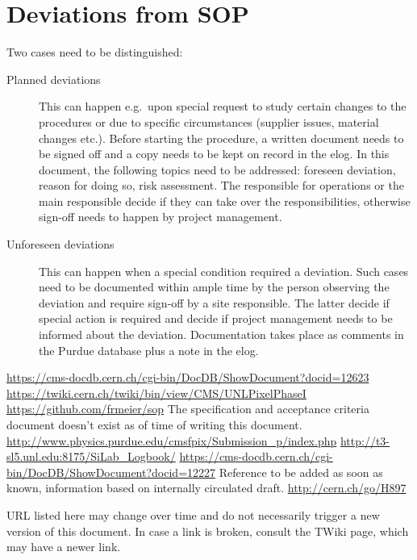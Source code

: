 \documentclass[12pt]{unlsilabsop}
\begin{document}
\section{Deviations from SOP}
Two cases need to be distinguished:
\begin{description}
    \item[Planned deviations] This can happen e.g.~upon special request to study certain changes to the procedures or due to specific circumstances (supplier issues, material changes etc.). Before starting the procedure, a written document needs to be signed off and a copy needs to be kept on record in the elog. In this document, the following topics need to be addressed: foreseen deviation, reason for doing so, risk assessment. The responsible for operations or the main responsible decide if they can take over the responsibilities, otherwise sign-off needs to happen by project management.
    \item[Unforeseen deviations] This can happen when a special condition required a deviation. Such cases need to be documented within ample time by the person observing the deviation and require sign-off by a site responsible. The latter decide if special action is required and decide if project management needs to be informed about the deviation. Documentation takes place as comments in the Purdue database plus a note in the elog.
\end{description}

\begin{thebibliography}{aaaaaaaa}
     \url{https://cms-docdb.cern.ch/cgi-bin/DocDB/ShowDocument?docid=12623}
     \url{https://twiki.cern.ch/twiki/bin/view/CMS/UNLPixelPhaseI}
     \url{https://github.com/frmeier/sop}
     The specification and acceptance criteria document doesn't exist as of time of writing this document.
     \url{http://www.physics.purdue.edu/cmsfpix/Submission_p/index.php}
     \url{http://t3-sl5.unl.edu:8175/SiLab_Logbook/}
     \url{https://cms-docdb.cern.ch/cgi-bin/DocDB/ShowDocument?docid=12227}
     Reference to be added as soon as known, information based on internally circulated draft.
     \url{http://cern.ch/go/H897}
\end{thebibliography}
URL listed here may change over time and do not necessarily trigger a new version of this document. In case a link is broken, consult the TWiki page, which may have a newer link.
\end{document}

